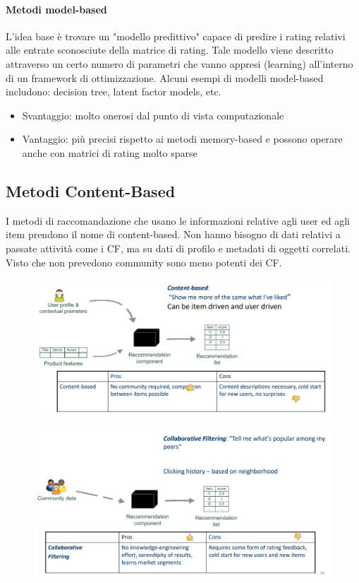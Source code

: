 \documentclass[12pt]{article}
\begin{document}
\paragraph{Metodi model-based}
L’idea base è trovare un "modello predittivo" capace di predire i rating relativi alle entrate sconosciute della matrice di rating. Tale modello viene descritto attraverso un certo numero di parametri che vanno appresi (learning) all’interno di un framework di ottimizzazione. Alcuni esempi di modelli model-based includono: decision tree, latent factor models, etc.
\begin{itemize}
    \item Svantaggio: molto onerosi dal punto di vista computazionale
    \item Vantaggio: più precisi rispetto ai metodi memory-based e possono operare anche con matrici di rating molto sparse
\end{itemize}

\subsection{Metodi Content-Based}
I metodi di raccomandazione che usano le informazioni relative agli user ed agli item prendono il nome di content-based. Non hanno bisogno di dati relativi a passate attività come i CF, ma su dati di profilo e metadati di oggetti correlati. Visto che non prevedono community sono meno potenti dei CF.
\FloatBarrier
\begin{figure}[!htb]
    \centering
    \includegraphics[width=1\textwidth]{images/CB.png}
\end{figure}
\FloatBarrier
\begin{figure}[!htb]
    \centering
    \includegraphics[width=1\textwidth]{images/CF.png}
\end{figure}
\FloatBarrier
\end{document}
